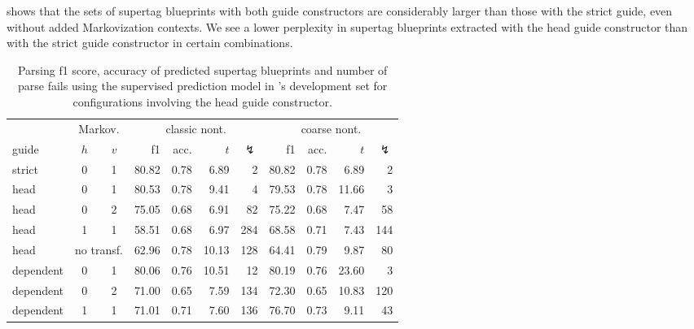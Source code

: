\documentclass[../../document.tex]{subfiles}
\begin{document}
     shows that the sets of supertag blueprints with both guide constructors are considerably larger than those with the strict guide, even without added Markovization contexts.
    We see a lower perplexity in supertag blueprints extracted with the head guide constructor than with the strict guide constructor in certain combinations.

    
    \begin{table}
        \caption{\label{tbl:gridsearch:head:2}
        Parsing f1 score, accuracy of predicted supertag blueprints and number of parse fails using the supervised prediction model in \negra{}'s development set for configurations involving the head guide constructor.
        }
        \centering
        \vspace{.2cm}
        \begin{tabular}{lcc|rrrr|rrrr}
            \toprule
            & \multicolumn{2}{c|}{Markov.} & \multicolumn{4}{c|}{classic nont.} &  \multicolumn{4}{c}{coarse nont.} \\
guide           & \(h\) & \(v\) & f1 & acc. & $t$ & $\lightning$ & f1 & acc. & $t$ & $\lightning$  \\ \hline \rowcolor{black!10}
strict & 0 & 1                         & 80.82 & 0.78 &  6.89 &   2 & 80.82 & 0.78 &  6.89 &   2 \\  \hline
head & 0 & 1                           & 80.53 & 0.78 &  9.41 &   4 & 79.53 & 0.78 & 11.66 &   3 \\
head & 0 & 2                           & 75.05 & 0.68 &  6.91 &  82 & 75.22 & 0.68 &  7.47 &  58 \\
head & 1 & 1                           & 58.51 & 0.68 &  6.97 & 284 & 68.58 & 0.71 &  7.43 & 144 \\
head & \multicolumn{2}{c|}{no transf.} & 62.96 & 0.78 & 10.13 & 128 & 64.41 & 0.79 &  9.87 &  80 \\\hline
dependent & 0 & 1                      & 80.06 & 0.76 & 10.51 &  12 & 80.19 & 0.76 & 23.60 &   3 \\
dependent & 0 & 2                      & 71.00 & 0.65 &  7.59 & 134 & 72.30 & 0.65 & 10.83 & 120 \\
dependent & 1 & 1                      & 71.01 & 0.71 &  7.60 & 136 & 76.70 & 0.73 &  9.11 &  43 \\
\bottomrule
        \end{tabular}
    \end{table}
\end{document}
